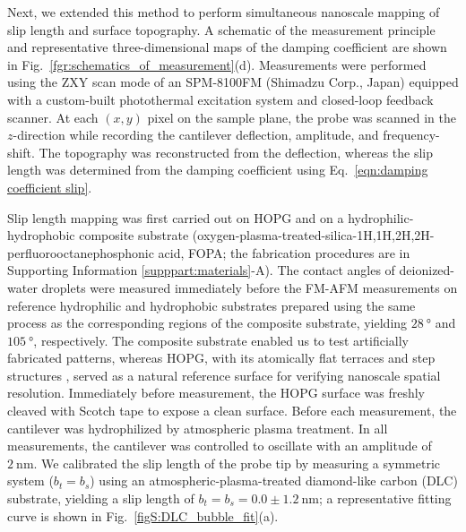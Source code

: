 \documentclass[journal=jacsat,manuscript=article]{achemso}
\providecommand{\DIFadd}[1]{{\protect\color{blue}#1}} %
\providecommand{\DIFdel}[1]{} %
\providecommand{\DIFaddbegin}{} %
\providecommand{\DIFaddend}{} %
\providecommand{\DIFdelbegin}{} %
\providecommand{\DIFdelend}{} %
\newcommand{\DIFaddincludegraphics}[2][]{{\color{blue}\DIFOincludegraphics[#1]{#2}}} %
\newcommand{\DIFdelincludegraphics}[2][]{} %
\DeclareRobustCommand{\DIFaddbegin}{\DIFOaddbegin \let\includegraphics\DIFaddincludegraphics} %
\DeclareRobustCommand{\DIFaddend}{\DIFOaddend \let\includegraphics\DIFOincludegraphics} %
\DeclareRobustCommand{\DIFdelbegin}{\DIFOdelbegin \let\includegraphics\DIFdelincludegraphics} %
\DeclareRobustCommand{\DIFdelend}{\DIFOaddend \let\includegraphics\DIFOincludegraphics} %
\begin{document}
Next, we extended this method to perform simultaneous nanoscale mapping of slip length and surface topography. A schematic of the measurement principle and representative three-dimensional maps of the damping coefficient are shown in Fig.~\ref{fgr:schematics_of_measurement}(d). Measurements were performed using the ZXY scan mode of an SPM-8100FM (Shimadzu Corp., Japan) equipped with a custom-built photothermal excitation system and closed-loop feedback scanner. At each \((x, y)\) pixel on the sample plane, the probe was scanned in the \(z\)-direction while recording the cantilever deflection, amplitude, and frequency-shift. The topography was reconstructed from the deflection, whereas the slip length was determined from the damping coefficient using Eq.~\ref{eqn:damping coefficient slip}. 

Slip length mapping was first carried out on HOPG and on a hydrophilic-hydrophobic composite substrate (oxygen-plasma-treated-silica-1H,1H,2H,2H-perfluorooctanephosphonic acid, FOPA; the fabrication procedures are in Supporting Information \ref{supppart:materials}-A). The contact angles of deionized-water droplets \DIFdelbegin \DIFdel{, measured separately on the }\DIFdelend \DIFaddbegin \DIFadd{were measured immediately before the FM-AFM measurements on reference }\DIFaddend hydrophilic and hydrophobic \DIFdelbegin \DIFdel{surfaces, were }\DIFdelend \DIFaddbegin \DIFadd{substrates prepared using the same process as the corresponding regions of the composite substrate, yielding }\DIFaddend \(\SI{28}{\degree}\) and \(\SI{105}{\degree}\), respectively. The composite substrate enabled us to test artificially fabricated patterns, whereas HOPG, with its atomically flat terraces and step structures \cite{Chang1991-fz}, served as a natural reference surface for verifying nanoscale spatial resolution. \DIFdelbegin \DIFdel{Prior to }\DIFdelend \DIFaddbegin \DIFadd{Immediately before }\DIFaddend measurement, the HOPG surface was freshly cleaved with Scotch tape to expose a clean surface. Before each measurement, the cantilever was hydrophilized by atmospheric plasma treatment. In all measurements, the cantilever was controlled to oscillate with an amplitude of \(\SI{2}{\nano\metre}\). We calibrated the slip length of the probe tip by measuring a symmetric system (\(b_t = b_s\)) using an atmospheric-plasma-treated diamond-like carbon (DLC) substrate, yielding a slip length of \(b_t = b_s = 0.0 \pm \SI{1.2}{\nano\metre}\)\DIFdelbegin \DIFdel{. 
}\DIFdelend \DIFaddbegin \DIFadd{; a representative fitting curve is shown in Fig.~\ref{figS:DLC_bubble_fit}(a).
}\DIFaddend 
\end{document}
